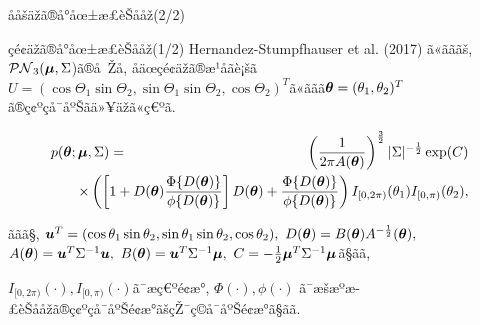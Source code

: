 \documentclass[dvipdfmx]{beamer} %
\newcommand{\bm}[1]{\mbox{\boldmath $#1$}}
\begin{document}
\begin{frame}{ååšäžã®å°åœ±æ­£èŠååž(2/2)}
\end{frame}

\begin{frame}{çé¢äžã®å°åœ±æ­£èŠååž(1/2)}
Hernandez-Stumpfhauser et al. (2017) ã«ãããš, $\mathcal{PN}_3(\bm \mu,\Sigma$)ã®å Žå, åäœçé¢äžã®æ¹åãè¡šã$U = (\cos\Theta_1 \sin \Theta_2, \sin\Theta_1 \sin \Theta_2, \cos \Theta_2)^T$ã«ããã$\bm \theta = (\theta_1, \theta_2)^T$ã®ç¢ºçå¯åºŠãä»¥äžã«ç€ºã.

\vspace{-0.2cm}
\small %
\begin{eqnarray*}
\label{PNS}
p(\bm \theta; \bm \mu, \Sigma) &=& \left(\frac{1}{2\pi A(\bm \theta)}\right)^{\frac{3}{2}} |\Sigma|^{-\frac{1}{2}}
\exp(C) \nonumber \\ 
&& \hspace{-1.5cm} \times \left( \left[1 + D(\bm \theta) \frac{\Phi \{D(\bm \theta)\}}{\phi \{D(\bm \theta)\}} \right] D(\bm \theta) + \frac{\Phi \{D(\bm \theta)\}}{\phi \{D(\bm \theta)\}} \right) I_{[0,2\pi)}(\theta_1) I_{[0,\pi)}(\theta_2),
\end{eqnarray*}
\normalsize

ããã§, $\bm u^T = (\cos\theta_1 \sin \theta_2, \sin\theta_1 \sin \theta_2, \cos \theta_2), \ D(\bm \theta) = B(\bm \theta) A^{-\frac{1}{2}}(\bm \theta),$
$A(\bm \theta) = \bm u^T \Sigma^{-1} \bm u,\ B(\bm \theta) = \bm u^T \Sigma^{-1} \bm \mu, \ C = -\frac{1}{2} \bm \mu^T \Sigma^{-1} \bm \mu$ã§ãã, 

$I_{[0,2\pi)} (\cdot), I_{[0,\pi)}(\cdot)$ã¯æç€ºé¢æ°, $\Phi(\cdot), \phi(\cdot)$ ã¯æšæºæ­£èŠååžã®ç¢ºçå¯åºŠé¢æ°ãšçŽ¯ç©å¯åºŠé¢æ°ã§ãã. 
\end{frame}
\end{document}
